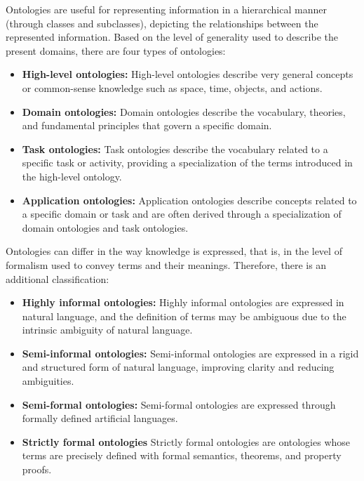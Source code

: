 Ontologies are useful for representing information in a hierarchical manner (through classes and subclasses), depicting the relationships between the represented information. Based on the level of generality used to describe the present domains, there are four types of ontologies:
\begin{itemize}
    \item \textbf{High-level ontologies:} High-level ontologies describe very general concepts or common-sense knowledge such as space, time, objects, and actions.

    \item \textbf{Domain ontologies:} Domain ontologies describe the vocabulary, theories, and fundamental principles that govern a specific domain.

    \item \textbf{Task ontologies:} Task ontologies describe the vocabulary related to a specific task or activity, providing a specialization of the terms introduced in the high-level ontology.

    \item \textbf{Application ontologies:} Application ontologies describe concepts related to a specific domain or task and are often derived through a specialization of domain ontologies and task ontologies.
\end{itemize}
Ontologies can differ in the way knowledge is expressed, that is, in the level of formalism used to convey terms and their meanings. Therefore, there is an additional classification:
\begin{itemize}
    \item \textbf{Highly informal ontologies:} Highly informal ontologies are expressed in natural language, and the definition of terms may be ambiguous due to the intrinsic ambiguity of natural language.

    \item \textbf{Semi-informal ontologies:} Semi-informal ontologies are expressed in a rigid and structured form of natural language, improving clarity and reducing ambiguities.

    \item \textbf{Semi-formal ontologies:} Semi-formal ontologies are expressed through formally defined artificial languages.

    \item \textbf{Strictly formal ontologies} Strictly formal ontologies are ontologies whose terms are precisely defined with formal semantics, theorems, and property proofs.
\end{itemize}

